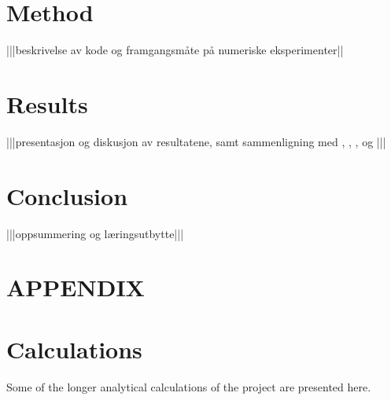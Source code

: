\documentclass[a4paper,8pt]{article}
\begin{document}
\begin{multicols}{2}
\section{Method}\label{method}
|||beskrivelse av kode og framgangsmåte på numeriske eksperimenter||


\section{Results}\label{results}
|||presentasjon og diskusjon av resultatene, samt sammenligning med \cite{SWL}, \cite{GN}, \cite{HLS}, \cite{IP} og \cite{PJ}|||


\section{Conclusion}
|||oppsummering og læringsutbytte|||


\end{multicols}




\newpage
\appendix
\setcounter{equation}{0}
\renewcommand{\theequation}{\thesection\arabic{equation}}
\section*{APPENDIX}
\section{Calculations}
Some of the longer analytical calculations of the project are presented here.
\end{document}
